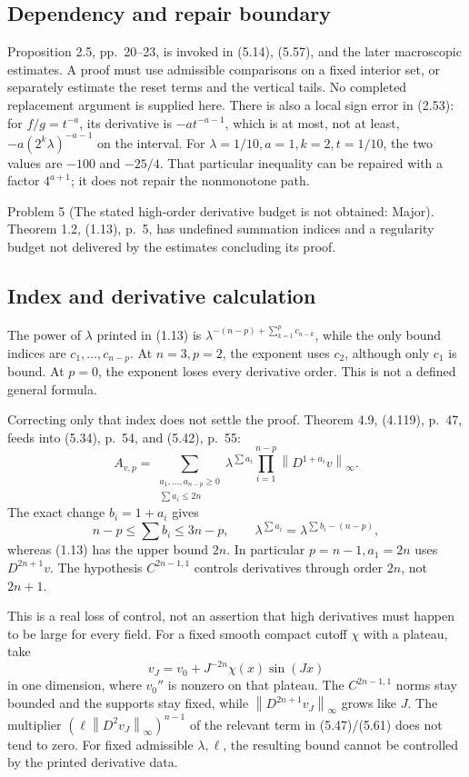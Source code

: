 \documentclass[10pt]{article}
\begin{document}
\subsection*{Dependency and repair boundary}
Proposition 2.5, pp. 20–23, is invoked in (5.14), (5.57), and the later macroscopic estimates. A proof must use admissible comparisons on a fixed interior set, or separately estimate the reset terms and the vertical tails. No completed replacement argument is supplied here. There is also a local sign error in (2.53): for \(f/g=t^{-a}\), its derivative is \(-at^{-a-1}\), which is at most, not at least, \(-a(2^k\lambda)^{-a-1}\) on the interval. For \(\lambda=1/10,a=1,k=2,t=1/10\), the two values are \(-100\) and \(-25/4\). That particular inequality can be repaired with a factor \(4^{a+1}\); it does not repair the nonmonotone path.\par
Problem 5 (The stated high-order derivative budget is not obtained: Major).  Theorem 1.2, (1.13), p. 5, has undefined summation indices and a regularity budget not delivered by the estimates concluding its proof.\par
\subsection*{Index and derivative calculation}
The power of \(\lambda\) printed in (1.13) is \(\lambda^{-(n-p)+\sum_{k=1}^p c_{n-k}}\), while the only bound indices are \(c_1,\ldots,c_{n-p}\). At \(n=3,p=2\), the exponent uses \(c_2\), although only \(c_1\) is bound. At \(p=0\), the exponent loses every derivative order. This is not a defined general formula.\par
Correcting only that index does not settle the proof. Theorem 4.9, (4.119), p. 47, feeds into (5.34), p. 54, and (5.42), p. 55: \[A_{v,p}=\sum_{\substack{a_1,\ldots,a_{n-p}\geq0\\
                        \sum a_i\leq2n}}
 \lambda^{\sum a_i}\prod_{i=1}^{n-p}\left\lVert D^{1+a_i}v\right\rVert_\infty .\] The exact change \(b_i=1+a_i\) gives \[n-p\leq\sum b_i\leq3n-p,\qquad
 \lambda^{\sum a_i}=\lambda^{\sum b_i-(n-p)},\] whereas (1.13) has the upper bound \(2n\). In particular \(p=n-1,a_1=2n\) uses \(D^{2n+1}v\). The hypothesis \(C^{2n-1,1}\) controls derivatives through order \(2n\), not \(2n+1\).\par
This is a real loss of control, not an assertion that high derivatives must happen to be large for every field. For a fixed smooth compact cutoff \(\chi\) with a plateau, take \[v_J=v_0+J^{-2n}\chi(x)\sin(Jx)\] in one dimension, where \(v_0''\) is nonzero on that plateau. The \(C^{2n-1,1}\) norms stay bounded and the supports stay fixed, while \(\left\lVert D^{2n+1}v_J\right\rVert_\infty\) grows like \(J\). The multiplier \((\ell\left\lVert D^2v_J\right\rVert_\infty)^{n-1}\) of the relevant term in (5.47)/(5.61) does not tend to zero. For fixed admissible \(\lambda,\ell\), the resulting bound cannot be controlled by the printed derivative data.\par
\end{document}
